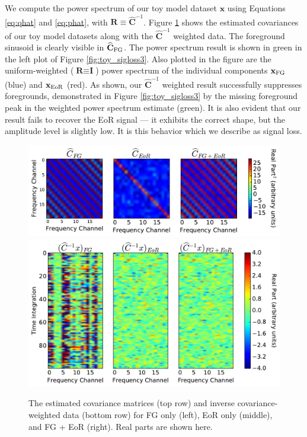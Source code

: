 \documentclass[preprint2,numberedappendix,tighten]{aastex6}  %
\begin{document}
We compute the power spectrum of our toy model dataset $\textbf{x}$ using Equations \ref{eq:qhat} and \ref{eq:phat}, with $\textbf{R} \equiv \widehat{\textbf{C}}^{-1}$.  Figure \ref{fig:toy_sigloss12} shows the estimated covariances of our toy model datasets along with the $\widehat{\textbf{C}}^{-1}$ weighted data. The foreground sinusoid is clearly visible in $\widehat{\textbf{C}}_{\rm FG}$.  The power spectrum result is shown in green in the left plot of Figure \ref{fig:toy_sigloss3}. Also plotted in the figure are the uniform-weighted ($\textbf{R} \equiv \textbf{I}$) power spectrum of the individual components $\textbf{x}_{\rm FG}$ (blue) and $\textbf{x}_{\rm EoR}$ (red). As shown, our $\widehat{\textbf{C}}^{-1}$ weighted result successfully suppresses foregrounds,
demonstrated in Figure \ref{fig:toy_sigloss3} by the missing foreground peak in the weighted power spectrum estimate (green).  It is also evident that our result fails to recover the EoR signal --- it exhibits the correct shape, but the amplitude level is slightly low.  It is this behavior which we describe as signal loss.

\begin{figure}
	\centering
	\includegraphics[trim={0cm 0cm 0cm 0cm},clip,width=\columnwidth]{plots/toy_sigloss12.pdf}
	\includegraphics[trim={0cm 0cm 0cm 0cm},clip,width=\columnwidth]{plots/toy_sigloss13.pdf}
	\caption{The estimated covariance matrices (top row) and inverse covariance-weighted data (bottom row) for FG only (left), EoR only 
(middle), and FG + EoR (right). Real parts are shown here.}
	\label{fig:toy_sigloss12}
\end{figure}
\end{document}
